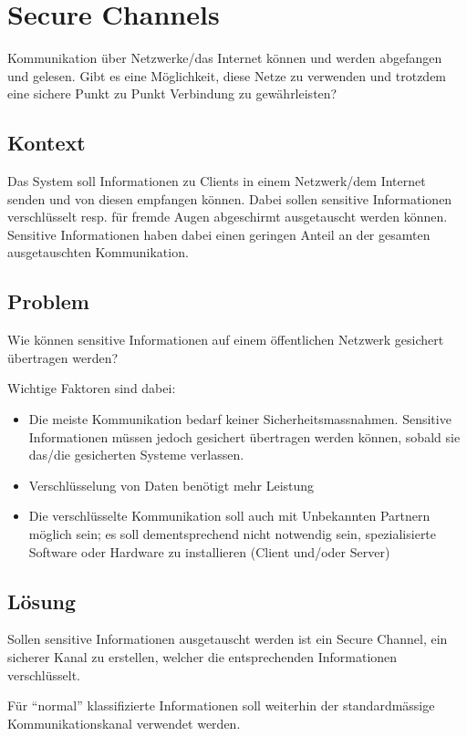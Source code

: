 \section{Secure Channels}
Kommunikation über Netzwerke/das Internet können und werden abgefangen und gelesen. Gibt es eine Möglichkeit, diese Netze zu verwenden und trotzdem eine sichere Punkt zu Punkt Verbindung zu gewährleisten?

\subsection*{Kontext}
Das System soll Informationen zu Clients in einem Netzwerk/dem Internet senden und von diesen empfangen können. Dabei sollen sensitive Informationen verschlüsselt resp. für fremde Augen abgeschirmt ausgetauscht werden können. Sensitive Informationen haben dabei einen geringen Anteil an der gesamten ausgetauschten Kommunikation.

\subsection*{Problem}
Wie können sensitive Informationen auf einem öffentlichen Netzwerk gesichert übertragen werden?

Wichtige Faktoren sind dabei:

\begin{itemize}
	\item Die meiste Kommunikation bedarf keiner Sicherheitsmassnahmen. Sensitive Informationen müssen jedoch gesichert übertragen werden können, sobald sie das/die gesicherten Systeme verlassen.
	\item Verschlüsselung von Daten benötigt mehr Leistung
	\item Die verschlüsselte Kommunikation soll auch mit Unbekannten Partnern möglich sein; es soll dementsprechend nicht notwendig sein, spezialisierte Software oder Hardware zu installieren (Client und/oder Server)
\end{itemize}

\subsection*{Lösung}
Sollen sensitive Informationen ausgetauscht werden ist ein Secure Channel, ein sicherer Kanal zu erstellen, welcher die entsprechenden Informationen verschlüsselt.

Für ``normal'' klassifizierte Informationen soll weiterhin der standardmässige Kommunikationskanal verwendet werden.


